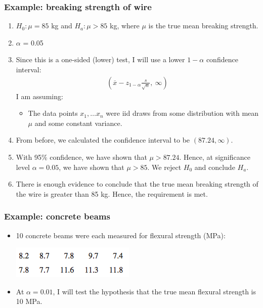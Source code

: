 \documentclass[handout]{beamer}\usepackage{graphicx, color}
\providecommand{\ov}[1]{\overline{#1}}
\numberwithin{equation}{section}
\begin{document}
\begin{frame}
\frametitle{Example: breaking strength of wire} \scriptsize
\begin{enumerate}[1. ]
\item $H_0: \mu = 85$ kg and $H_a: \mu > 85$ kg, where $\mu$ is the true mean breaking strength.
\pause \item $\alpha$ = 0.05
\pause \item Since this is a one-sided (lower) test, I will use a lower $1 - \alpha$ confidence interval:
\pause \begin{align*}
\left (\ov{x} - z_{1 - \alpha} \frac{s}{\sqrt{n}}, \ \infty \right )
\end{align*}
\pause I am assuming:
\pause \begin{itemize}
\pause \item The data points $x_1, \ldots x_n$ were iid draws from some distribution with mean $\mu$ and some constant variance.
\end{itemize}
\pause \item From before, we calculated the confidence interval to be $(87.24, \infty)$.
\pause \item With 95\% confidence, we have shown that $\mu > 87.24$. Hence, at significance level $\alpha = 0.05$, we have shown that $\mu > 85$. We reject $H_0$ and conclude $H_a$.
\pause \item There is enough evidence to conclude that the true mean breaking strength of the wire is greater than 85 kg. Hence, the requirement is met.
\end{enumerate}
\end{frame}

\begin{frame}
\frametitle{Example: concrete beams}
\begin{itemize}
\item 10 concrete beams were each measured for flexural strength (MPa):
\begin{center}
 \includegraphics{../../fig/fbeams.png}
\end{center}
\item At $\alpha = 0.01$, I will test the hypothesis that the true mean flexural strength is 10 MPa.
\end{itemize}
\end{frame}
\end{document}
